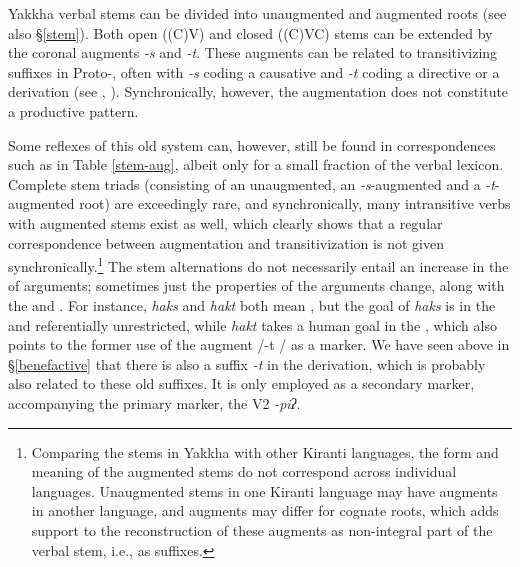 Yakkha verbal stems can be divided into unaugmented and augmented roots (see also §\ref{stem}). Both open ((C)V) and closed ((C)VC) stems can be extended by the coronal augments \emph{-s} and \emph{-t}. These augments can be related to transitivizing suffixes in Proto-, often with \emph{-s} coding a causative and \emph{-t} coding a directive or a  derivation (see \citet[457]{Matisoff2003Handbook}, \citet[160]{Driem1989_Reflexes}). Synchronically, however, the augmentation does not constitute a productive pattern. 

Some reflexes of this old system can, however, still be found in correspondences such as in Table \ref{stem-aug}, albeit only for a small fraction of the verbal lexicon. Complete stem triads (consisting of an unaugmented, an \emph{-s}-augmented and a \emph{-t}-augmented root) are exceedingly rare, and synchronically, many intransitive verbs with augmented stems exist as well, which clearly shows that a regular correspondence between augmentation and transitivization is not given synchronically.\footnote{Comparing the stems in Yakkha with other Kiranti languages, the form and meaning of the augmented stems do not correspond across individual languages. Unaugmented stems in one Kiranti language may have augments in another language, and augments may differ for cognate roots, which adds support to the reconstruction of these augments as non-integral part of the verbal stem, i.e., as suffixes.} The stem alternations do not necessarily entail an increase in the  of arguments; sometimes just the properties of the arguments change, along with the  and . For instance, \emph{haks} and \emph{hakt} both mean , but the goal of \emph{haks} is in the   and referentially unrestricted, while \emph{hakt} takes a human goal in the , which also points to the former use of the augment /-t / as a  marker. We have seen above in §\ref{benefactive} that there is also a suffix \emph{-t}  in the  derivation, which is probably also related to these old suffixes. It is only employed as a secondary marker, accompanying the primary  marker, the V2 \emph{-piʔ}. 



